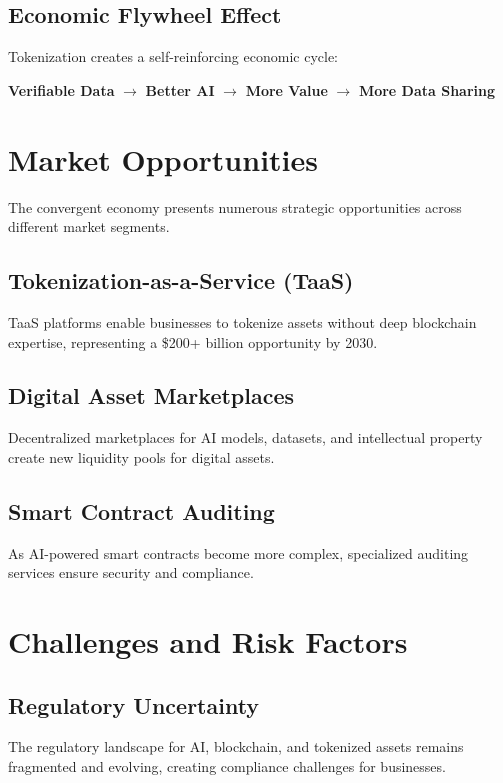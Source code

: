 \documentclass[11pt,a4paper]{report}
\begin{document}
\section{Economic Flywheel Effect}

Tokenization creates a self-reinforcing economic cycle:

\textbf{Verifiable Data} $\rightarrow$ \textbf{Better AI} $\rightarrow$ \textbf{More Value} $\rightarrow$ \textbf{More Data Sharing}

\chapter{Market Opportunities}

The convergent economy presents numerous strategic opportunities across different market segments.

\section{Tokenization-as-a-Service (TaaS)}

TaaS platforms enable businesses to tokenize assets without deep blockchain expertise, representing a \$200+ billion opportunity by 2030.

\section{Digital Asset Marketplaces}

Decentralized marketplaces for AI models, datasets, and intellectual property create new liquidity pools for digital assets.

\section{Smart Contract Auditing}

As AI-powered smart contracts become more complex, specialized auditing services ensure security and compliance.

\chapter{Challenges and Risk Factors}

\section{Regulatory Uncertainty}

The regulatory landscape for AI, blockchain, and tokenized assets remains fragmented and evolving, creating compliance challenges for businesses.
\end{document}
